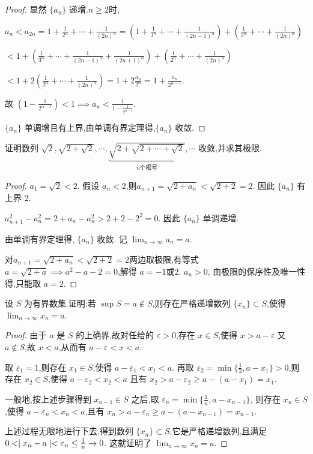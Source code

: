 \begin{proof}
    显然 $\{a_n\}$ 递增.$n\ge 2$时,
    
    $a_n<a_{2n}=1+\frac{1}{2^\alpha}+\cdots+\frac{1}{(2n)^{\alpha}}=(1+\frac{1}{3^n}+\cdots+\frac{1}{(2n-1)^{\alpha}})+(\frac{1}{2^\alpha}+\cdots+\frac{1}{(2n)^\alpha})$

    $<1+(\frac{1}{3^\alpha}+\cdots+\frac{1}{(2n-1)^{\alpha}}+\frac{1}{(2n+1)^\alpha})+(\frac{1}{2^\alpha}+\cdots+\frac{1}{(2n)^\alpha})$
    
    $<1+2(\frac{1}{2^\alpha}+\cdots+\frac{1}{(2n)^\alpha})=1+2\frac{a_n}{2^\alpha}=1+\frac{a_n}{2^{\alpha-1}}$. 

    故 $(1-\frac{1}{2^{\alpha-1}})<1\implies a_n<\frac{1}{1-\frac{1}{2^{\alpha-1}}}$.

    $\{a_n\}$ 单调增且有上界,由单调有界定理得,$\{a_n\}$ 收敛.
\end{proof}

\begin{example}
    证明数列 $\sqrt{2},\sqrt{2+\sqrt{2}},\cdots,\underbrace{\sqrt{2+\sqrt{2+\cdots+\sqrt{2}}}}_{n\text{个根号}},\cdots$ 收敛,并求其极限.
\end{example}

\begin{proof}
    $a_1=\sqrt{2}<2$. 假设 $a_n<2$,则$a_{n+1}=\sqrt{2+a_n}<\sqrt{2+2}=2$. 因此 $\{a_n\}$ 有上界 $2$.
    
    $a_{n+1}^2-a_n^2=2+a_n-a_n^2>2+2-2^2=0$. 因此 $\{a_n\}$ 单调递增.

    由单调有界定理得, $\{a_n\}$ 收敛. 记 $\lim_{n\to\infty} a_n=a$.

    对$a_{n+1}=\sqrt{2+a_n}<\sqrt{2+2}=2$两边取极限,有等式 $a=\sqrt{2+a}\implies a^2-a-2=0$,解得 $a=-1\text{或}2$. $a_n>0$, 由极限的保序性及唯一性得,只能取 $a=2$.
\end{proof}

\begin{example}
    设 $S$ 为有界数集.证明:若 $\sup S=a\notin S$,则存在严格递增数列 $\{x_n\}\subset S$,使得 $\lim_{n\to\infty} x_n=a$. 
\end{example}

\begin{proof}
    由于 $a$ 是 $S$ 的上确界,故对任给的 $\varepsilon>0$,存在 $x\in S$,使得 $x>a-\varepsilon$.又 $a\notin S$,故 $x<a$,从而有 $a-\varepsilon<x<a$.

    取 $\varepsilon_1=1$,则存在 $x_1\in S$,使得 $a-\varepsilon_1<x_1<a$. 再取 $\varepsilon_2=\min\{\frac{1}{2},a-x_1\}>0$,则存在 $x_2\in S$,使得 $a-\varepsilon_2<x_2<a$ 且有 $x_2>a-\varepsilon_2\ge a-(a-x_1)=x_1$.

    一般地,按上述步骤得到 $x_{n-1}\in S$ 之后,取 $\varepsilon_n=\min\{\frac{1}{n},a-x_{n-1}\}$, 则存在 $x_n\in S$,使得 $a-\varepsilon_n<x_n<a$,且有 $x_n>a-\varepsilon_n\ge a-(a-x_{n-1})=x_{n-1}$.
    
    上述过程无限地进行下去,得到数列 $\{x_n\}\subset S$,它是严格递增数列,且满足 $0< \mid x_n-a \mid<\varepsilon_n\le \frac{1}{n} \to 0$. 这就证明了 $\lim_{n\to\infty} x_n=a$.
\end{proof}

